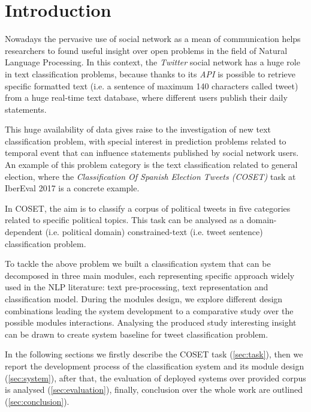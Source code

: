 \section{Introduction} \label{sec:introduction}

Nowadays the pervasive use of social network as a mean of communication helps researchers to found useful insight over open problems in the field of Natural Language Processing. %
In this context, the \emph{Twitter} social network has a huge role in text classification problems, because thanks to its \emph{API} is possible to retrieve specific formatted text (i.e. a sentence of maximum 140 characters called tweet) from a huge real-time text database, where different users publish their daily statements.

This huge availability of data gives raise to the investigation of new text classification problem, with special interest in prediction problems related to temporal event that can influence statements published by social network users. An example of this problem category is the text classification related to general election, where the  \emph{Classification Of Spanish Election Tweets (COSET)} task at IberEval 2017 is a concrete example. %

In COSET, the aim is to classify a corpus of political tweets in five categories related to specific political topics. This task can be analysed as a domain-dependent (i.e. political domain) constrained-text (i.e. tweet sentence) classification problem.

To tackle the above problem we built a classification system that can be decomposed in three main modules, each representing specific approach widely used in the NLP literature: text pre-processing, text representation and classification model.
During the modules design, we explore different design combinations leading the system development to a comparative study over the possible modules interactions.
Analysing the produced study interesting insight can be drawn to create system baseline for tweet classification problem.

In the following sections we firstly describe the COSET task (\cref{sec:task}), then we report the development process of the classification system and its module design (\cref{sec:system}), after that, the evaluation of deployed systems over provided corpus is analysed (\cref{sec:evaluation}), finally, conclusion over the whole work are outlined (\cref{sec:conclusion}).



